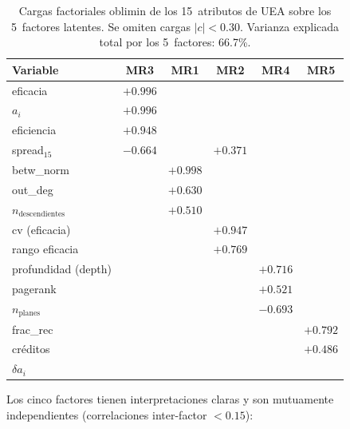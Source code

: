 \documentclass[11pt,letterpaper]{article}
\begin{document}
\begin{table}[H]\centering
\caption{Cargas factoriales oblimin de los 15~atributos de UEA sobre los
  5~factores latentes.
  Se omiten cargas $|c| < 0.30$.
  Varianza explicada total por los 5~factores: 66.7\%.}
\label{tab:factores_uea}
\small
\begin{tabular}{lccccc}
\toprule
Variable & MR3 & MR1 & MR2 & MR4 & MR5 \\
\midrule
eficacia                 & $+0.996$ & & & & \\
$a_i$                    & $+0.996$ & & & & \\
eficiencia               & $+0.948$ & & & & \\
spread$_{15}$            & $-0.664$ & & $+0.371$ & & \\
betw\_norm               & & $+0.998$ & & & \\
out\_deg                 & & $+0.630$ & & & \\
$n_\text{descendientes}$ & & $+0.510$ & & & \\
cv (eficacia)            & & & $+0.947$ & & \\
rango eficacia           & & & $+0.769$ & & \\
profundidad (depth)      & & & & $+0.716$ & \\
pagerank                 & & & & $+0.521$ & \\
$n_\text{planes}$        & & & & $-0.693$ & \\
frac\_rec                & & & & & $+0.792$ \\
créditos                 & & & & & $+0.486$ \\
$\delta a_i$             & & & & & \\
\bottomrule
\end{tabular}
\end{table}

Los cinco factores tienen interpretaciones claras y son mutuamente
independientes (correlaciones inter-factor $< 0.15$):
\end{document}
